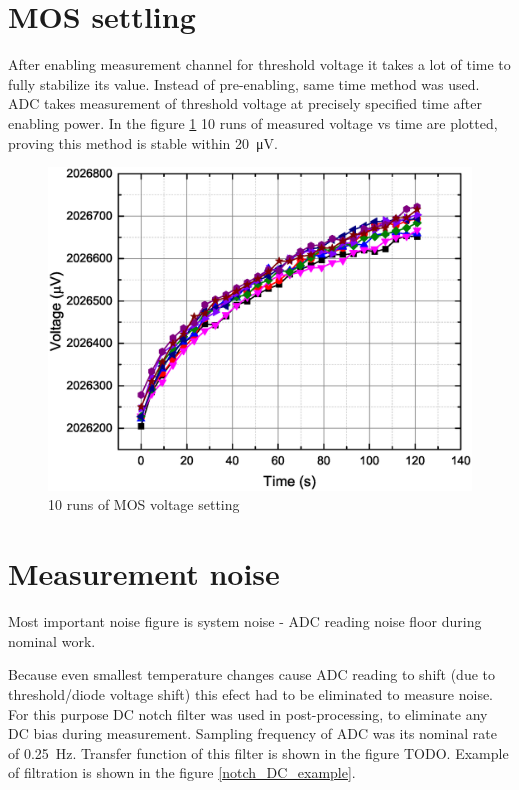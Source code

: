 \section{MOS settling}
    After enabling measurement channel for threshold voltage it takes a lot of time to fully stabilize its value. Instead of pre-enabling, same time method was used. ADC takes measurement of threshold voltage at precisely specified time after enabling power. In the figure \ref{MOS_settling} 10 runs of measured voltage vs time are plotted, proving this method is stable within \SI{20}{\uV}.

    \begin{figure}[H]
        \centering
        \includegraphics[width=0.8\paperwidth]{img/07/MOS_settling.eps}
        \caption{10 runs of MOS voltage setting}
        \label{MOS_settling}
    \end{figure}

\section{Measurement noise}
    Most important noise figure is system noise - ADC reading noise floor during nominal work.

    Because even smallest temperature changes cause ADC reading to shift (due to threshold/diode voltage shift) this efect had to be eliminated to measure noise. For this purpose DC notch filter was used in post-processing, to eliminate any DC bias during measurement. Sampling frequency of ADC was its nominal rate of \SI{0.25}{\hertz}. Transfer function of this filter is shown in the figure TODO. Example of filtration is shown in the figure \ref{notch_DC_example}.

